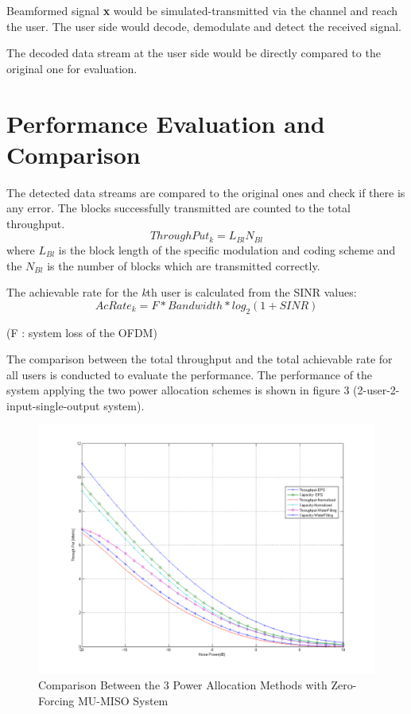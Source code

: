 \documentclass{article}
\begin{document}
\noindent
Beamformed signal \textbf{x} would be simulated-transmitted via the channel and reach the user.
The user side would decode, demodulate and detect the received signal.

\noindent
The decoded data stream at the user side would be directly compared to the original one for evaluation.


\section{Performance Evaluation and Comparison}
The detected data streams are compared to the original ones and check if there is any error. The blocks successfully transmitted are counted to the total throughput.
\[ThroughPut_k = L_{Bl}N_{Bl}\]
where $L_{Bl}$ is the block length of the specific modulation and coding scheme and the $N_{Bl}$ is the number of blocks which are transmitted correctly.

\noindent
The achievable rate for the \textit{k}th user is calculated from the SINR values:
$$AcRate_k = F*Bandwidth*log_2(1+SINR)$$
\begin{center}(F : system loss of the OFDM)\end{center}
The comparison between the total throughput and the total achievable rate for all users is conducted to evaluate the performance.
The performance of the system applying the two power allocation schemes is shown in figure 3 (2-user-2-input-single-output system).


\begin{figure}[ht]
\centering
\includegraphics[scale=0.45]{Comparison.png}
\caption{Comparison Between the 3 Power Allocation Methods with Zero-Forcing MU-MISO System}
\label{fig:Comparison}
\end{figure}
\end{document}
